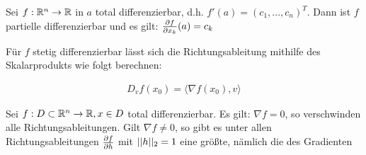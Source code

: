 \begin{satz}
	Sei $f : \mathbb{R}^n \rightarrow \mathbb{R}$ in $a$ total differenzierbar, d.h. $f'(a) = (c_1,...,c_n)^T$. Dann ist $f$ partielle differenzierbar und es gilt: $\frac{\partial f}{\partial x_k}(a) = c_k$
\end{satz}


\begin{satz}
	Für $f$ stetig differenzierbar lässt sich die Richtungsableitung mithilfe des Skalarprodukts wie folgt berechnen:
	
	\begin{align*}
	D_v f(x_0) = \langle \nabla f(x_0), v \rangle 
	\end{align*}
\end{satz}

\begin{satz}
	Sei $f : D \subset \mathbb{R}^n \rightarrow \mathbb{R}, x \in D$ total differenzierbar. Es gilt: $\nabla f = 0$, so verschwinden alle Richtungsableitungen.	Gilt $\nabla f \neq 0$, so gibt es unter allen Richtungsableitungen $\frac{\partial f}{\partial h}$ mit $||h||_2 = 1$ eine größte, nämlich die des Gradienten
\end{satz}

